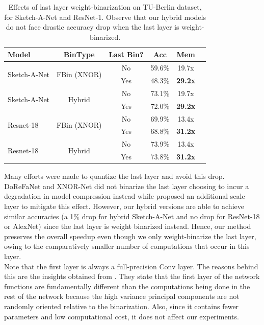 \begin{table}[t]
  \centering
\begin{tabular}{|l|c|c|c|c|c|}

\hline
{\bf Model} & {\bf BinType} & {\bf Last Bin?} & {\bf Acc } & {\bf Mem}\\
\hline
\multirow{2}{*}{Sketch-A-Net} & \multirow{2}{*}{FBin (XNOR)} & No & 59.6\% & 19.7x \\
 &  & Yes & 48.3\% & {\bf 29.2x} \\

\hline
\multirow{2}{*}{Sketch-A-Net} & \multirow{2}{*}{Hybrid} & No & 73.1\% & 19.7x \\
 &  & Yes & 72.0\% & {\bf 29.2x} \\
\hline
\multirow{2}{*}{Resnet-18} & \multirow{2}{*}{FBin (XNOR)} & No & 69.9\% & 13.4x \\
 &  & Yes & 68.8\% & {\bf 31.2x} \\

\hline
\multirow{2}{*}{Resnet-18} & \multirow{2}{*}{Hybrid} & No & 73.9\% & 13.4x \\
 &  & Yes & 73.8\% & {\bf 31.2x} \\
\hline
\end{tabular}
\caption{Effects of last layer weight-binarization on TU-Berlin dataset, for Sketch-A-Net and ResNet-1. Observe that our hybrid models do not face drastic accuracy drop when the last layer is weight-binarized.}
\label{table:otherresults}
\end{table}

\noindent Many efforts were made to quantize the last layer and avoid this drop. DoReFaNet and XNOR-Net did not binarize the last layer choosing to incur a degradation in model compression instead while \cite{tang2017train} proposed an additional scale layer to mitigate this effect. However, our hybrid versions are able to achieve similar accuracies (a 1\% drop for hybrid Sketch-A-Net and no drop for ResNet-18 or AlexNet) since the last layer is weight binarized instead. Hence, our method preserves the overall speedup even though we only weight-binarize the last layer, owing to the comparatively smaller number of computations that occur in this layer.\\

\noindent Note that the first layer is always a full-precision Conv layer. The reasons behind this are the insights obtained from \cite{anderson2017high}. They state that the first layer of the network functions are fundamentally different than the computations being done in the rest of the network because the high variance principal components are not randomly oriented relative to the binarization. Also, since it contains fewer parameters and low computational cost, it does not affect our experiments.

